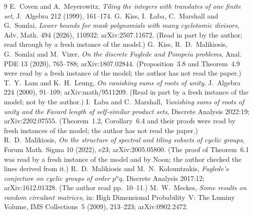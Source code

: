 \documentclass[11pt,a4paper]{amsart}
\theoremstyle{definition}
\theoremstyle{remark}
\begin{document}
\begin{thebibliography}{9}
 E.~Coven and A.~Meyerowitz, \emph{Tiling the integers with translates of one finite set},
 J.~Algebra 212 (1999), 161--174.
 G.~Kiss, I.~{\L}aba, C.~Marshall and G.~Somlai, \emph{Lower bounds for mask polynomials with many
cyclotomic divisors}, Adv. Math. 494 (2026), 110932; arXiv:2507.11672. (Read in part by the author; read
 through by a fresh instance of the model.)
 G.~Kiss, R.~D.~Malikiosis, G.~Somlai and M.~Vizer, \emph{On the discrete Fuglede and Pompeiu
 problems}, Anal. PDE 13 (2020), 765--788; arXiv:1807.02844. (Proposition~3.8 and Theorem~4.9 were read by a
 fresh instance of the model; the author has not read the paper.)
 T.~Y.~Lam and K.~H.~Leung, \emph{On vanishing sums of roots of unity}, J.~Algebra 224 (2000),
 91--109; arXiv:math/9511209. (Read in part by a fresh instance of the model; not by the author.)
 I.~{\L}aba and C.~Marshall, \emph{Vanishing sums of roots of unity and the Favard length of
 self-similar product sets}, Discrete Analysis 2022:19; arXiv:2202.07555. (Theorem~1.2, Corollary~6.4 and
 their proofs were read by fresh instances of the model; the author has not read the paper.)
 R.~D.~Malikiosis, \emph{On the structure of spectral and tiling subsets of cyclic groups}, Forum
 Math. Sigma 10 (2022), e23; arXiv:2005.05800. (The proof of Theorem~6.1 was read by a fresh instance of the
 model and by Noon; the author checked the lines derived from it.)
 R.~D.~Malikiosis and M.~N.~Kolountzakis, \emph{Fuglede's conjecture on cyclic groups of order
 $p^nq$}, Discrete Analysis 2017:12; arXiv:1612.01328. (The author read pp.~10--11.)
 M.~W.~Meckes, \emph{Some results on random circulant matrices}, in: High Dimensional Probability~V:
The Luminy Volume, IMS Collections~5 (2009), 213--223; arXiv:0902.2472.

\end{thebibliography}
\end{document}
